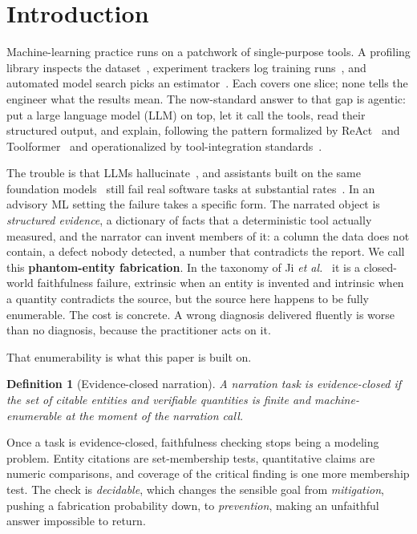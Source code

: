 \documentclass[conference]{IEEEtran}
\newtheorem*{definitionx}{Definition}
\begin{document}
\section{Introduction}
Machine-learning practice runs on a patchwork of single-purpose tools. A profiling library inspects the dataset~\cite{ydata}, experiment trackers log training runs~\cite{mlflow,tensorflow}, and automated model search picks an estimator~\cite{autosklearn}. Each covers one slice; none tells the engineer what the results mean. The now-standard answer to that gap is agentic: put a large language model (LLM) on top, let it call the tools, read their structured output, and explain, following the pattern formalized by ReAct~\cite{react} and Toolformer~\cite{toolformer} and operationalized by tool-integration standards~\cite{mcp}.

The trouble is that LLMs hallucinate~\cite{ji,huang}, and assistants built on the same foundation models~\cite{codex} still fail real software tasks at substantial rates~\cite{swebench}. In an advisory ML setting the failure takes a specific form. The narrated object is \emph{structured evidence}, a dictionary of facts that a deterministic tool actually measured, and the narrator can invent members of it: a column the data does not contain, a defect nobody detected, a number that contradicts the report. We call this \textbf{phantom-entity fabrication}. In the taxonomy of Ji \emph{et al.}~\cite{ji} it is a closed-world faithfulness failure, extrinsic when an entity is invented and intrinsic when a quantity contradicts the source, but the source here happens to be fully enumerable. The cost is concrete. A wrong diagnosis delivered fluently is worse than no diagnosis, because the practitioner acts on it.

That enumerability is what this paper is built on.
\begin{definitionx}[Evidence-closed narration]
A narration task is \emph{evidence-closed} if the set of citable entities and verifiable quantities is finite and machine-enumerable at the moment of the narration call.
\end{definitionx}
Once a task is evidence-closed, faithfulness checking stops being a modeling problem. Entity citations are set-membership tests, quantitative claims are numeric comparisons, and coverage of the critical finding is one more membership test. The check is \emph{decidable}, which changes the sensible goal from \emph{mitigation}, pushing a fabrication probability down, to \emph{prevention}, making an unfaithful answer impossible to return.
\end{document}
